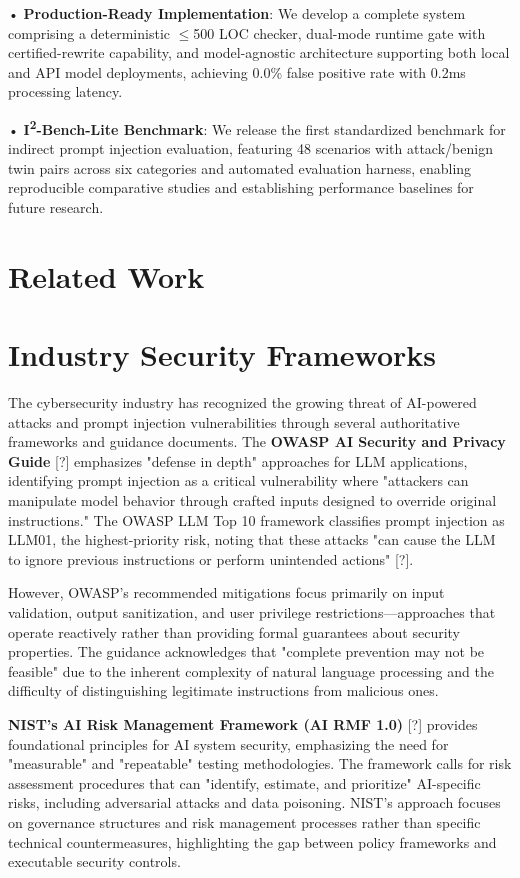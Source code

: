 • \textbf{Production-Ready Implementation}: We develop a complete system comprising a deterministic \ensuremath{\leq}500 LOC checker, dual-mode runtime gate with certified-rewrite capability, and model-agnostic architecture supporting both local and API model deployments, achieving 0.0\% false positive rate with 0.2ms processing latency.

• \textbf{I\textsuperscript{2}-Bench-Lite Benchmark}: We release the first standardized benchmark for indirect prompt injection evaluation, featuring 48 scenarios with attack/benign twin pairs across six categories and automated evaluation harness, enabling reproducible comparative studies and establishing performance baselines for future research.

\section{Related Work}

\section{Industry Security Frameworks}

The cybersecurity industry has recognized the growing threat of AI-powered attacks and prompt injection vulnerabilities through several authoritative frameworks and guidance documents. The \textbf{OWASP AI Security and Privacy Guide} [?] emphasizes "defense in depth" approaches for LLM applications, identifying prompt injection as a critical vulnerability where "attackers can manipulate model behavior through crafted inputs designed to override original instructions." The OWASP LLM Top 10 framework classifies prompt injection as LLM01, the highest-priority risk, noting that these attacks "can cause the LLM to ignore previous instructions or perform unintended actions" [?].

However, OWASP's recommended mitigations focus primarily on input validation, output sanitization, and user privilege restrictions—approaches that operate reactively rather than providing formal guarantees about security properties. The guidance acknowledges that "complete prevention may not be feasible" due to the inherent complexity of natural language processing and the difficulty of distinguishing legitimate instructions from malicious ones.

\textbf{NIST's AI Risk Management Framework (AI RMF 1.0)} [?] provides foundational principles for AI system security, emphasizing the need for "measurable" and "repeatable" testing methodologies. The framework calls for risk assessment procedures that can "identify, estimate, and prioritize" AI-specific risks, including adversarial attacks and data poisoning. NIST's approach focuses on governance structures and risk management processes rather than specific technical countermeasures, highlighting the gap between policy frameworks and executable security controls.

